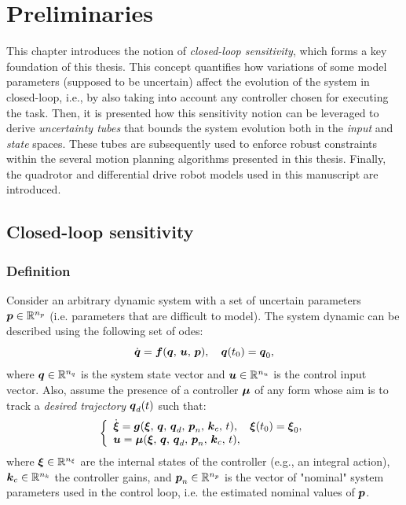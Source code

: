 \chapter{Preliminaries}\label{chap:models}

This chapter introduces the notion of \emph{closed-loop sensitivity}, which forms a key foundation of this thesis.
This concept quantifies how variations of some model parameters (supposed to be uncertain) affect the evolution of the system in closed-loop, i.e., by also taking into account any controller chosen for executing the task.
Then, it is presented how this sensitivity notion can be leveraged to derive \emph{uncertainty tubes} that bounds the system evolution both in the \emph{input} and \emph{state} spaces.
These tubes are subsequently used to enforce robust constraints within the several motion planning algorithms presented in this thesis.
Finally, the quadrotor and differential drive robot models used in this manuscript are introduced.

\section{Closed-loop sensitivity}\label{sec:sensi_and_tubes}

\subsection{Definition}\label{sec:sensi}

Consider an arbitrary dynamic system with a set of uncertain parameters $\boldsymbol{p} \in \mathbb{R}^{n_p}$ (i.e. parameters that are difficult to model).
The system dynamic can be described using the following set of \gls{odes}:
\begin{equation}\label{eq:dyna}
    \dot{\boldsymbol{q}}=\boldsymbol{f}(\boldsymbol{q},\,\boldsymbol{u},\,\boldsymbol{p}), \quad \boldsymbol{q}(t_0)=\boldsymbol{q}_{0},
\end{equation}
where $\boldsymbol{q}\in \mathbb{R}^{n_{q}}$ is the system state vector and $\boldsymbol{u}\in \mathbb{R}^{n_{u}}$ is the control input vector.
Also, assume the presence of a controller $\boldsymbol{\mu}$ of any form whose aim is to track a \emph{desired trajectory} $\boldsymbol{q}_d(t)$ such that:
\begin{equation}\label{eq:ctrl}
     \left \{
     \begin{array}{l l}
          \dot{\boldsymbol{\xi}} = \boldsymbol{g}(\boldsymbol{\xi},\,\boldsymbol{q},\,\boldsymbol{q}_d,\,\boldsymbol{p}_n,\,\boldsymbol{k}_c,\,t), \quad \boldsymbol{\xi}(t_0)=\boldsymbol{\xi}_{0}, \\
          \boldsymbol{u}=\boldsymbol{\mu}(\boldsymbol{\xi},\,\boldsymbol{q},\,\boldsymbol{q}_d,\,\boldsymbol{p}_n,\,\boldsymbol{k}_c,\,t), 
   \end{array} 
   \right .
\end{equation}
where $\boldsymbol{\xi}\in \mathbb{R}^{n_{\xi}}$ are the internal states of the controller (e.g., an integral action), $\boldsymbol{k}_{c}\in \mathbb{R}^{n_{k}}$ the controller gains, and $\boldsymbol{p}_{n}\in{\mathbb{R}^{n_{p}}}$ is the vector of "nominal" system parameters used in the control loop, i.e. the estimated nominal values of $\boldsymbol{p}$.

